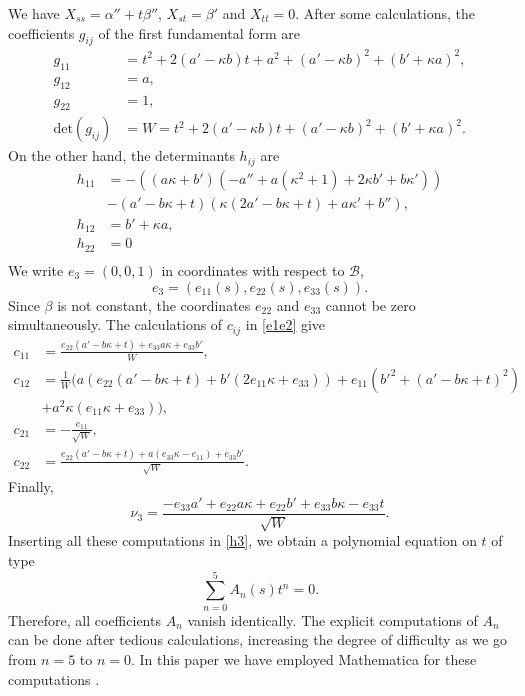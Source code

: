 \documentclass[12pt,a4paper,reqno]{amsart}
\begin{document}
We have $X_{ss}=\alpha''+t\beta''$, $X_{st}=\beta'$ and $X_{tt}=0$. After some calculations, the coefficients $g_{ij}$ of the first fundamental form are 
\begin{equation*}
\begin{split}
g_{11}&=t^2+2(a'-\kappa b)t+a^2+(a'-\kappa b)^2+(b'+\kappa a)^2,\\
g_{12}&=a,\\
g_{22}&=1,\\
\mbox{det}(g_{ij})&=W=t^2+2(a'-\kappa b)t +(a'-\kappa b)^2+(b'+\kappa a)^2.
\end{split}
\end{equation*}
On the other hand, the determinants $h_{ij}$ are
\begin{equation*}
\begin{split}
h_{11}&=-\left((a \kappa+b') (-a''+a (\kappa^2+1)+2 \kappa b'+b \kappa')\right)\\
&-\left(a'-b \kappa+t\right) \left(\kappa (2 a'-b \kappa+t)+a \kappa'+b''\right), \\
h_{12}&=b'+\kappa a,\\
h_{22}&=0\\
\end{split}
\end{equation*}
We write $e_3=(0,0,1)$  in coordinates with respect to $\mathcal{B}$,  
$$e_{3}=(e_{11}(s),e_{22}(s),e_{33}(s)).$$
 Since $\beta$ is not constant,   the coordinates $e_{22}$ and $e_{33}$ cannot be zero simultaneously. The calculations of $c_{ij}$ in \eqref{e1e2}  give
\begin{equation*}
\begin{split}
c_{11}&=\frac{e_{22} \left(a'-b \kappa +t\right)+e_{33} a \kappa +e_{33} b'}{W},\\
c_{12}&=\frac{1}{W}\Big( a \left(e_{22} \left(a'-b \kappa +t\right)+b' (2 e_{11} \kappa +e_{33})\right)+e_{11} (b'^2+(a'-b \kappa +t)^2)\\
&+a^2 \kappa  (e_{11} \kappa +e_{33})\Big),\\
c_{21}&=-\frac{e_{11}}{\sqrt{W}},\\
c_{22}&=\frac{e_{22} \left(a'-b \kappa +t\right)+a (e_{33} \kappa -e_{11})+e_{33} b'}{\sqrt{W}}.
\end{split}
\end{equation*}
Finally, 
\begin{equation}\label{nu3}
\nu_3=\frac{-e_{33} a'+e_{22} a\kappa+e_{22} b'+e_{33} b\kappa-e_{33} t}{\sqrt{W}}.
\end{equation}
Inserting all these computations in \eqref{h3}, we obtain a polynomial equation on $t$ of type
\begin{equation}\label{st}
\sum_{n=0}^5 A_n(s) t^n=0.
\end{equation}
Therefore, all coefficients $A_n$ vanish identically. The explicit computations of $A_n$ can be done after tedious calculations, increasing the degree of difficulty as we go from $n=5$ to $n=0$.   In this paper we have employed Mathematica for these computations \cite{wo}. 
\end{document}
